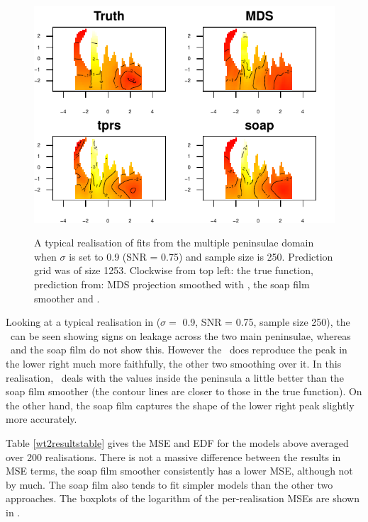\begin{figure}
\centering
\includegraphics[width=6in]{mds/figs/wt2-comp-09.pdf} \\
\caption{A typical realisation of fits from the multiple peninsulae domain when $\sigma$ is set to 0.9 (SNR = 0.75) and sample size is 250. Prediction grid was of size 1253. Clockwise from top left: the true function, prediction from: MDS projection smoothed with \tprs, the soap film smoother and \tprs.}
\label{wt2-comp-0.9}
\end{figure}

Looking at a typical realisation in  ($\sigma=$ 0.9, SNR = 0.75, sample size 250), the \tprs\ can be seen showing signs on leakage across the two main peninsulae, whereas \mdsap\ and the soap film do not show this. However the \tprs\ does reproduce the peak in the lower right much more faithfully, the other two smoothing over it. In this realisation, \mdsap\ deals with the values inside the peninsula a little better than the soap film smoother (the contour lines are closer to those in the true function). On the other hand, the soap film captures the shape of the lower right peak slightly more accurately.

Table \ref{wt2resultstable} gives the MSE and EDF for the models above averaged over 200 realisations. There is not a massive difference between the results in MSE terms, the soap film smoother consistently has a lower MSE, although not by much. The soap film also tends to fit simpler models than the other two approaches. The boxplots of the logarithm of the per-realisation MSEs are shown in .

